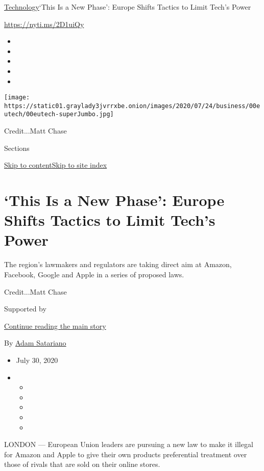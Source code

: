 \href{/section/technology}{Technology}\textbar{}`This Is a New Phase':
Europe Shifts Tactics to Limit Tech's Power

\href{https://nyti.ms/2D1uiQy}{https://nyti.ms/2D1uiQy}

\begin{itemize}
\item
\item
\item
\item
\item
\end{itemize}

\texttt{[image: https://static01.graylady3jvrrxbe.onion/images/2020/07/24/business/00eutech/00eutech-superJumbo.jpg]}

Credit...Matt Chase

Sections

\protect\hyperlink{site-content}{Skip to
content}\protect\hyperlink{site-index}{Skip to site index}

\hypertarget{this-is-a-new-phase-europe-shifts-tactics-to-limit-techs-power}{%
\section{`This Is a New Phase': Europe Shifts Tactics to Limit Tech's
Power}\label{this-is-a-new-phase-europe-shifts-tactics-to-limit-techs-power}}

The region's lawmakers and regulators are taking direct aim at Amazon,
Facebook, Google and Apple in a series of proposed laws.

Credit...Matt Chase

Supported by

\protect\hyperlink{after-sponsor}{Continue reading the main story}

By \href{https://www.nytimes3xbfgragh.onion/by/adam-satariano}{Adam
Satariano}

\begin{itemize}
\item
  July 30, 2020
\item
  \begin{itemize}
  \item
  \item
  \item
  \item
  \item
  \end{itemize}
\end{itemize}

LONDON --- European Union leaders are pursuing a new law to make it
illegal for Amazon and Apple to give their own products preferential
treatment over those of rivals that are sold on their online stores.

